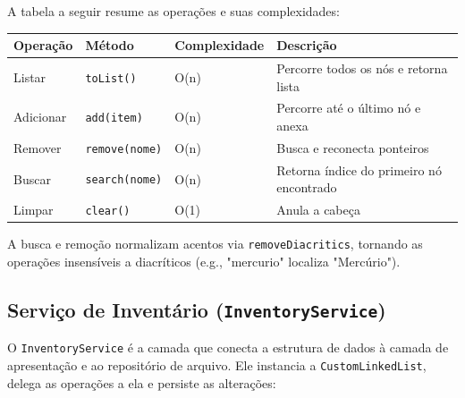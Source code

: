 \documentclass[12pt,a4paper]{article}
\begin{document}
A tabela a seguir resume as operações e suas complexidades:

\begin{table}[h]
\centering
\begin{tabular}{|l|l|l|l|}
\hline
\textbf{Operação} & \textbf{Método} & \textbf{Complexidade} & \textbf{Descrição} \\
\hline
Listar & \texttt{toList()} & O(n) & Percorre todos os nós e retorna lista \\
\hline
Adicionar & \texttt{add(item)} & O(n) & Percorre até o último nó e anexa \\
\hline
Remover & \texttt{remove(nome)} & O(n) & Busca e reconecta ponteiros \\
\hline
Buscar & \texttt{search(nome)} & O(n) & Retorna índice do primeiro nó encontrado \\
\hline
Limpar & \texttt{clear()} & O(1) & Anula a cabeça \\
\hline
\end{tabular}
\end{table}

A busca e remoção normalizam acentos via \texttt{removeDiacritics}, tornando as operações insensíveis a diacríticos (e.g., "mercurio" localiza "Mercúrio").

\subsection{Serviço de Inventário (\texttt{InventoryService})}

O \texttt{InventoryService} é a camada que conecta a estrutura de dados à camada de apresentação e ao repositório de arquivo. Ele instancia a \texttt{CustomLinkedList}, delega as operações a ela e persiste as alterações:
\end{document}
